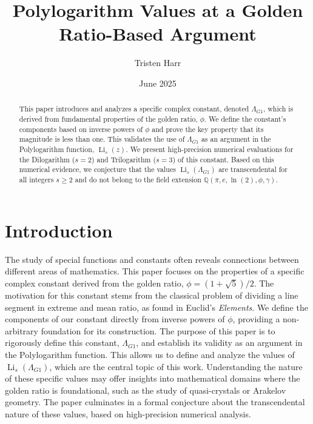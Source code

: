 \documentclass{amsart}
\theoremstyle{plain}
\theoremstyle{definition}
\theoremstyle{remark}
\DeclareMathOperator{\Li}{Li} %
\newcommand{\LambdaG}{\Lambda_{G1}}
\begin{document}
\title[Polylogarithms at a Golden Ratio Argument]{Polylogarithm Values at a Golden Ratio-Based Argument}
\author{Tristen Harr}
\date{June 2025}

\begin{abstract}
This paper introduces and analyzes a specific complex constant, denoted $\LambdaG$, which is derived from fundamental properties of the golden ratio, $\phi$.
We define the constant's components based on inverse powers of $\phi$ and prove the key property that its magnitude is less than one.
This validates the use of $\LambdaG$ as an argument in the Polylogarithm function, $\Li_s(z)$.
We present high-precision numerical evaluations for the Dilogarithm ($s=2$) and Trilogarithm ($s=3$) of this constant.
Based on this numerical evidence, we conjecture that the values $\Li_s(\LambdaG)$ are transcendental for all integers $s \ge 2$ and do not belong to the field extension $\mathbb{Q}(\pi, e, \ln(2), \phi, \gamma)$.
\end{abstract}

\maketitle

\section{Introduction}
The study of special functions and constants often reveals connections between different areas of mathematics.
This paper focuses on the properties of a specific complex constant derived from the golden ratio, $\phi = (1+\sqrt{5})/2$.
The motivation for this constant stems from the classical problem of dividing a line segment in extreme and mean ratio, as found in Euclid's \textit{Elements}.
We define the components of our constant directly from inverse powers of $\phi$, providing a non-arbitrary foundation for its construction.
The purpose of this paper is to rigorously define this constant, $\LambdaG$, and establish its validity as an argument in the Polylogarithm function.
This allows us to define and analyze the values of $\Li_s(\LambdaG)$, which are the central topic of this work. Understanding the nature of these specific values may offer insights into mathematical domains where the golden ratio is foundational, such as the study of quasi-crystals or Arakelov geometry.
The paper culminates in a formal conjecture about the transcendental nature of these values, based on high-precision numerical analysis.
\end{document}
